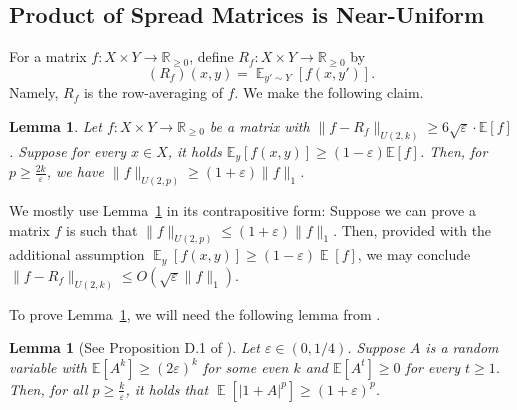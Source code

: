 \documentclass[11pt]{article}
\newtheorem{lemma}[theorem]{Lemma}
\DeclareMathOperator*{\E}{\mathbb{E}}
\newcommand{\1}{ \mathbbm{1}}
\newcommand{\eps}{\varepsilon}
\begin{document}
\subsection{Product of Spread Matrices is Near-Uniform}\label{sec: spread matrix - spectral positive}

For a matrix $f:X\times Y\to \mathbb{R}_{\ge 0}$, define $R_f:X\times Y\to \mathbb{R}_{\ge 0}$ by
$$
(R_f)(x,y) = \E_{y'\sim Y}[f(x,y')].
$$
Namely, $R_f$ is the row-averaging of $f$. We make the following claim.

\begin{lemma}\label{lemma:matrix-shift}
    Let $f:X\times Y\to \mathbb{R}_{\ge 0}$ be a matrix with $\| f - R_f\|_{U(2,k)}\ge 6\sqrt{\eps}\cdot \mathbb{E}[f]$. Suppose for every $x\in X$, it holds $\mathbb{E}_{y}[f(x,y)] \ge (1-\varepsilon) \mathbb{E}[f]$. Then, for $p \ge \frac{2k}{\varepsilon}$, we have $\|f\|_{U(2,p)}\ge (1+\varepsilon)\|f\|_1$.
\end{lemma}

We mostly use Lemma~\ref{lemma:matrix-shift} in its contrapositive form: Suppose we can prove a matrix $f$ is such that $\|f\|_{U(2,p)}\le (1+\eps) \|f\|_1$. Then, provided with the additional assumption $\E_y[f(x,y)] \ge (1-\eps)\E[f]$, we may conclude $\|f - R_f\|_{U(2,k)} \le O(\sqrt{\varepsilon} \|f\|_1)$.

To prove Lemma~\ref{lemma:matrix-shift}, we will need the following lemma from \cite{KelleyM2023strong}.

\begin{lemma}[See Proposition D.1 of \cite{KelleyM2023strong}]\label{lemma:spectral-positive}
    Let $\eps \in (0,1/4)$. Suppose $A$ is a random variable with $\mathbb{E}[A^k] \ge (2\varepsilon)^k$ for some even $k$ and $\mathbb{E}[A^t] \ge 0$ for every $t\ge 1$. Then, for all $p \ge \frac{k}{\eps}$, it holds that $\E[|1+A|^p] \ge (1+\eps)^{p}$. 
\end{lemma}
\end{document}
